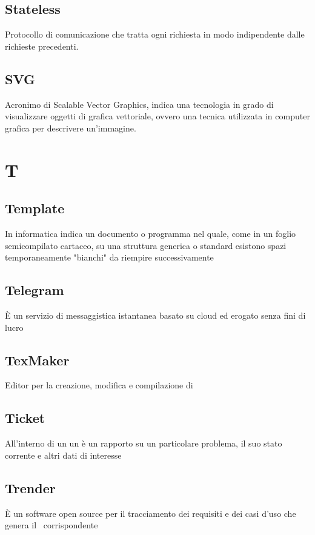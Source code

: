 {{		\subsection{Stateless}
		Protocollo di comunicazione che tratta ogni richiesta in modo indipendente dalle richieste precedenti.


		\subsection{SVG}
		Acronimo di Scalable Vector Graphics, indica una tecnologia in grado di visualizzare oggetti di grafica vettoriale, ovvero una tecnica utilizzata in computer grafica per descrivere un'immagine.

\section{T}
		\subsection{Template}
		In informatica indica un documento o programma nel quale, come in un foglio semicompilato cartaceo, su una struttura generica o standard esistono spazi temporaneamente "bianchi" da riempire successivamente


		\subsection{Telegram}
		È un servizio di messaggistica istantanea basato su cloud ed erogato senza fini di lucro


		\subsection{TexMaker}
		Editor per la creazione, modifica e compilazione di  \glossaryItem{\LaTeX}


		\subsection{Ticket}
		All'interno di un  un  è un rapporto su un particolare problema, il suo stato corrente e altri dati di interesse


		\subsection{Trender}
		È un software open source per il tracciamento dei requisiti e dei casi d'uso che genera il  \ corrispondente


}}
